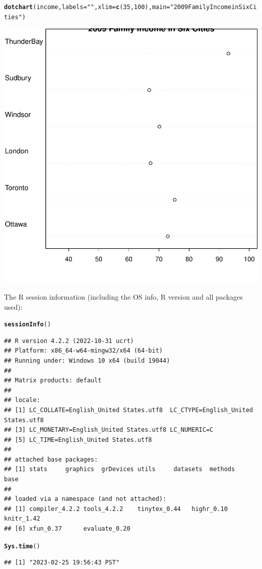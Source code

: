 \documentclass{article}\usepackage[]{graphicx}\usepackage[]{xcolor}
\makeatletter
\newcommand{\hlnum}[1]{\textcolor[rgb]{0.686,0.059,0.569}{#1}}%
\newcommand{\hlstr}[1]{\textcolor[rgb]{0.192,0.494,0.8}{#1}}%
\newcommand{\hlstd}[1]{\textcolor[rgb]{0.345,0.345,0.345}{#1}}%
\newcommand{\hlkwc}[1]{\textcolor[rgb]{0.333,0.667,0.333}{#1}}%
\newcommand{\hlkwd}[1]{\textcolor[rgb]{0.737,0.353,0.396}{\textbf{#1}}}%
\newenvironment{kframe}{%
 \def\at@end@of@kframe{}%
 \ifinner\ifhmode%
  \def\at@end@of@kframe{\end{minipage}}%
  \begin{minipage}{\columnwidth}%
 \fi\fi%
 \def\FrameCommand##1{\hskip\@totalleftmargin \hskip-\fboxsep
 \colorbox{shadecolor}{##1}\hskip-\fboxsep
     \hskip-\linewidth \hskip-\@totalleftmargin \hskip\columnwidth}%
 \MakeFramed {\advance\hsize-\width
   \@totalleftmargin\z@ \linewidth\hsize
   \@setminipage}}%
 {\par\unskip\endMakeFramed%
 \at@end@of@kframe}
\newenvironment{knitrout}{}{} %
\makeatother
\begin{document}
\begin{knitrout}
\begin{kframe}\begin{alltt}
\hlkwd{dotchart}\hlstd{(income,} \hlkwc{labels} \hlstd{=} \hlstr{""}\hlstd{,} \hlkwc{xlim} \hlstd{=} \hlkwd{c}\hlstd{(}\hlnum{35}\hlstd{,}\hlnum{100}\hlstd{),} \hlkwc{main} \hlstd{=} \hlstr{"2009 Family Income in Six Cities"}\hlstd{)}
\end{alltt}
\end{kframe}

{\centering \includegraphics[width=.6\linewidth]{figure/Meng51940633A3-Rnwauto-report-2} 

}


\end{knitrout}

The R session information (including the OS info, R version and all
packages used):

\begin{knitrout}
\color{fgcolor}\begin{kframe}
\begin{alltt}
\hlkwd{sessionInfo}\hlstd{()}
\end{alltt}
\begin{verbatim}
## R version 4.2.2 (2022-10-31 ucrt)
## Platform: x86_64-w64-mingw32/x64 (64-bit)
## Running under: Windows 10 x64 (build 19044)
## 
## Matrix products: default
## 
## locale:
## [1] LC_COLLATE=English_United States.utf8  LC_CTYPE=English_United States.utf8   
## [3] LC_MONETARY=English_United States.utf8 LC_NUMERIC=C                          
## [5] LC_TIME=English_United States.utf8    
## 
## attached base packages:
## [1] stats     graphics  grDevices utils     datasets  methods   base     
## 
## loaded via a namespace (and not attached):
## [1] compiler_4.2.2 tools_4.2.2    tinytex_0.44   highr_0.10     knitr_1.42    
## [6] xfun_0.37      evaluate_0.20
\end{verbatim}
\begin{alltt}
\hlkwd{Sys.time}\hlstd{()}
\end{alltt}
\begin{verbatim}
## [1] "2023-02-25 19:56:43 PST"
\end{verbatim}
\end{kframe}
\end{knitrout}
\end{document}
